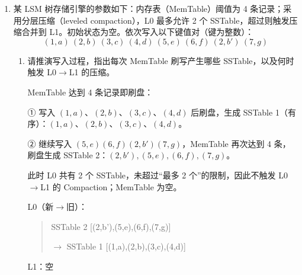 \documentclass[UTF8,a4paper,11pt]{ctexart}
\newenvironment{answer}%
  {\begin{ans}\noindent{\bfseries\color{ansframe}【答案】}\hspace{0.4em}}%
  {\end{ans}}
\begin{document}
\begin{enumerate}
\begin{enumerate}
\item 现要插入关键字 35，假设其随机层数为 2（即出现在 L0 和 L1）。请描述插入操作需要修改哪些指针，并写出插入后 L0 和 L1 的内容。
\begin{answer}
35 应插入 30 与 40 之间，且随机层数为 2，即出现在 L0、L1。需要修改：\par
L0：30.next = 35，35.next = 40；\par
L1：30.next = 35，35.next = 50；\par
同时建立 35 在 L0 与 L1 之间的垂直指针。插入后：
\begin{quote}\ttfamily\small
L1：head $\rightarrow$ 10 $\rightarrow$ 20 $\rightarrow$ 30 $\rightarrow$ 35 $\rightarrow$ 50 $\rightarrow$ null\par
L0：head $\rightarrow$ 5 $\rightarrow$ 10 $\rightarrow$ 20 $\rightarrow$ 30 $\rightarrow$ 35 $\rightarrow$ 40 $\rightarrow$ 50 $\rightarrow$ null
\end{quote}
\end{answer}

\item 跳表的期望时间复杂度为 $O(\log n)$，其前提假设是什么？若随机层数生成不均匀（例如绝大多数元素只有 L0），性能会退化到什么程度？
\begin{answer}
\textbf{前提假设：}每个节点的层数独立随机生成，通常按几何分布，每次继续升层的概率为 $p=1/2$，从而使第 $i+1$ 层节点数约为第 $i$ 层的一半。此时期望时间复杂度为 $O(\log n)$。\par
若绝大多数节点只有 L0，跳表退化为普通有序链表，查找、插入、删除的期望及最坏时间复杂度都可能退化为 $O(n)$。
\end{answer}
\end{enumerate}

\item 某 LSM 树存储引擎的参数如下：内存表（MemTable）阈值为 4 条记录；采用分层压缩（leveled compaction），L0 最多允许 2 个 SSTable，超过则触发压缩合并到 L1。初始状态为空。依次写入以下键值对（键为整数）：
\[
(1,a)\ (2,b)\ (3,c)\ (4,d)\ (5,e)\ (6,f)\ (2,b')\ (7,g)
\]

\begin{enumerate}
\item 请推演写入过程，指出每次 MemTable 刷写产生哪些 SSTable，以及何时触发 L0$\rightarrow$L1 的压缩。
\begin{answer}
MemTable 达到 4 条记录即刷盘：\par
① 写入 $(1,a)$、$(2,b)$、$(3,c)$、$(4,d)$ 后刷盘，生成 SSTable 1（有序）：$(1,a)$、$(2,b)$、$(3,c)$、$(4,d)$。\par
② 继续写入 $(5,e)(6,f)(2,b')(7,g)$，MemTable 再次达到 4 条，刷盘生成 SSTable 2：$(2,b'),(5,e),(6,f),(7,g)$。\par
此时 L0 共有 2 个 SSTable，未超过“最多 2 个”的限制，因此不触发 L0$\rightarrow$L1 的 Compaction；MemTable 为空。\par
L0（新$\rightarrow$旧）：
\begin{quote}\ttfamily\small
SSTable 2 [(2,b'),(5,e),(6,f),(7,g)]\par
\quad $\rightarrow$ SSTable 1 [(1,a),(2,b),(3,c),(4,d)]
\end{quote}
L1：空
\end{answer}


\end{enumerate}
\end{enumerate}
\end{document}
